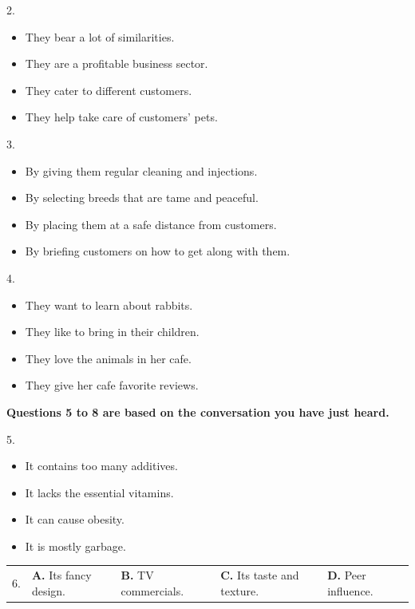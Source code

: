 \documentclass[UTF8,11pt]{ctexart}
\begin{document}
2.


\begin{itemize}[leftmargin=2em,itemsep=.2em,topsep=.4em]\item[A.] They bear a lot of similarities.
\item[B.] They are a profitable business sector.
\item[C.] They cater to different customers.
\item[D.] They help take care of customers' pets.
\end{itemize}

3.


\begin{itemize}[leftmargin=2em,itemsep=.2em,topsep=.4em]\item[A.] By giving them regular cleaning and injections.
\item[B.] By selecting breeds that are tame and peaceful.
\item[C.] By placing them at a safe distance from customers.
\item[D.] By briefing customers on how to get along with them.
\end{itemize}

4.


\begin{itemize}[leftmargin=2em,itemsep=.2em,topsep=.4em]\item[A.] They want to learn about rabbits.
\item[B.] They like to bring in their children.
\item[C.] They love the animals in her cafe.
\item[D.] They give her cafe favorite reviews.
\end{itemize}

\textbf{Questions 5 to 8 are based on the conversation you have just heard.}


5.


\begin{itemize}[leftmargin=2em,itemsep=.2em,topsep=.4em]\item[A.] It contains too many additives.
\item[B.] It lacks the essential vitamins.
\item[C.] It can cause obesity.
\item[D.] It is mostly garbage.
\end{itemize}

\noindent\begin{tabularx}{\linewidth}{@{}lXXXX@{}}6. & \textbf{A.} Its fancy design. & \textbf{B.} TV commercials. & \textbf{C.} Its taste and texture. & \textbf{D.} Peer influence.\\\end{tabularx}\par
\end{document}
